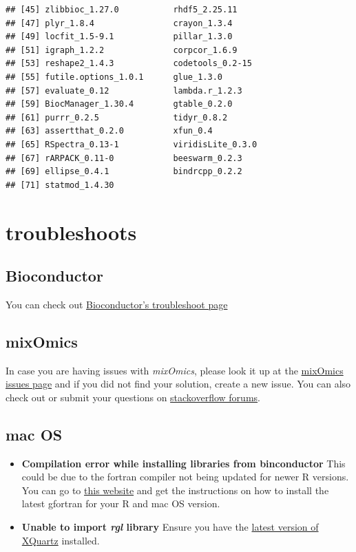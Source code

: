 \documentclass[]{book}
\theoremstyle{definition}
\theoremstyle{definition}
\theoremstyle{definition}
\theoremstyle{remark}
\begin{document}
\begin{verbatim}
## [45] zlibbioc_1.27.0           rhdf5_2.25.11            
## [47] plyr_1.8.4                crayon_1.3.4             
## [49] locfit_1.5-9.1            pillar_1.3.0             
## [51] igraph_1.2.2              corpcor_1.6.9            
## [53] reshape2_1.4.3            codetools_0.2-15         
## [55] futile.options_1.0.1      glue_1.3.0               
## [57] evaluate_0.12             lambda.r_1.2.3           
## [59] BiocManager_1.30.4        gtable_0.2.0             
## [61] purrr_0.2.5               tidyr_0.8.2              
## [63] assertthat_0.2.0          xfun_0.4                 
## [65] RSpectra_0.13-1           viridisLite_0.3.0        
## [67] rARPACK_0.11-0            beeswarm_0.2.3           
## [69] ellipse_0.4.1             bindrcpp_0.2.2           
## [71] statmod_1.4.30
\end{verbatim}

\hypertarget{troubleshoots}{%
\section{troubleshoots}\label{troubleshoots}}

\hypertarget{bioconductor}{%
\subsection{Bioconductor}\label{bioconductor}}

You can check out
\href{https://bioconductor.org/install/\#troubleshoot-bioconductor-packages}{Bioconductor's
troubleshoot page}

\hypertarget{mixomics}{%
\subsection{mixOmics}\label{mixomics}}

In case you are having issues with \emph{mixOmics}, please look it up at
the \href{https://bitbucket.org/klecao/package-mixomics/issues}{mixOmics
issues page} and if you did not find your solution, create a new issue.
You can also check out or submit your questions on
\href{https://stackoverflow.com/search?q=mixomics}{stackoverflow
forums}.

\hypertarget{mac-os}{%
\subsection{mac OS}\label{mac-os}}

\begin{itemize}
\item
  \textbf{Compilation error while installing libraries from
  binconductor} This could be due to the fortran compiler not being
  updated for newer R versions. You can go to
  \href{https://thecoatlessprofessor.com/programming/rcpp-rcpparmadillo-and-os-x-mavericks--lgfortran-and--lquadmath-error/}{this
  website} and get the instructions on how to install the latest
  gfortran for your R and mac OS version.
\item
  \textbf{Unable to import \emph{rgl} library } Ensure you have the
  \href{https://www.xquartz.org/}{latest version of XQuartz} installed.
\end{itemize}
\end{document}
